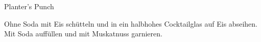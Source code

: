 \begin{recipe}{Planter's Punch}{}{}

  \freeform{}\textit{}


  Ohne Soda mit Eis schütteln und in ein halbhohes Cocktailglas auf Eis abseihen.
  Mit Soda auffüllen und mit Muskatnuss garnieren.

  \freeform{}\hrulefill{}

\end{recipe}
